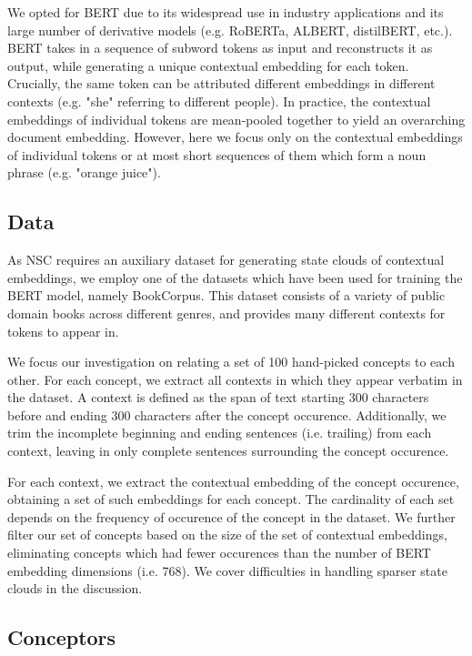 We opted for BERT due to its widespread use in industry applications and its large number of derivative models (e.g. RoBERTa, ALBERT, distilBERT, etc.). BERT takes in a sequence of subword tokens as input and reconstructs it as output, while generating a unique contextual embedding for each token. Crucially, the same token can be attributed different embeddings in different contexts (e.g. "she" referring to different people). In practice, the contextual embeddings of individual tokens are mean-pooled together to yield an overarching document embedding. However, here we focus only on the contextual embeddings of individual tokens or at most short sequences of them which form a noun phrase (e.g. "orange juice").

\subsection{Data}

As NSC requires an auxiliary dataset for generating state clouds of contextual embeddings, we employ one of the datasets which have been used for training the BERT model, namely BookCorpus. This dataset consists of a variety of public domain books across different genres, and provides many different contexts for tokens to appear in.

We focus our investigation on relating a set of 100 hand-picked concepts to each other. For each concept, we extract all contexts in which they appear verbatim in the dataset. A context is defined as the span of text starting 300 characters before and ending 300 characters after the concept occurence. Additionally, we trim the incomplete beginning and ending sentences (i.e. trailing) from each context, leaving in only complete sentences surrounding the concept occurence.

For each context, we extract the contextual embedding of the concept occurence, obtaining a set of such embeddings for each concept. The cardinality of each set depends on the frequency of occurence of the concept in the dataset. We further filter our set of concepts based on the size of the set of contextual embeddings, eliminating concepts which had fewer occurences than the number of BERT embedding dimensions (i.e. 768). We cover difficulties in handling sparser state clouds in the discussion.

\subsection{Conceptors}

